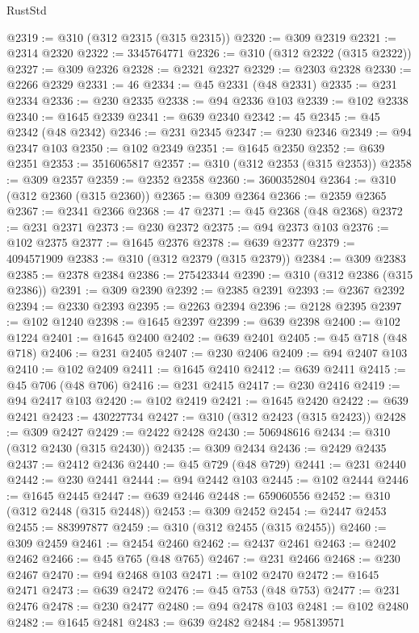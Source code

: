 \begin{lexlean}{RustStd}
\begin{coremodule}
{\begin{coremodule}
{{{{{{{{{{{{{{{{{{{{{{{{{{{{{{{{{{{{{@2319 := @310 (@312 @2315 (@315 @2315))
@2320 := @309 @2319
@2321 := @2314 @2320
@2322 := 3345764771
@2326 := @310 (@312 @2322 (@315 @2322))
@2327 := @309 @2326
@2328 := @2321 @2327
@2329 := @2303 @2328
@2330 := @2266 @2329
@2331 := 46
@2334 := @45 @2331 (@48 @2331)
@2335 := @231 @2334
@2336 := @230 @2335
@2338 := @94 @2336 @103
@2339 := @102 @2338
@2340 := @1645 @2339
@2341 := @639 @2340
@2342 := 45
@2345 := @45 @2342 (@48 @2342)
@2346 := @231 @2345
@2347 := @230 @2346
@2349 := @94 @2347 @103
@2350 := @102 @2349
@2351 := @1645 @2350
@2352 := @639 @2351
@2353 := 3516065817
@2357 := @310 (@312 @2353 (@315 @2353))
@2358 := @309 @2357
@2359 := @2352 @2358
@2360 := 3600352804
@2364 := @310 (@312 @2360 (@315 @2360))
@2365 := @309 @2364
@2366 := @2359 @2365
@2367 := @2341 @2366
@2368 := 47
@2371 := @45 @2368 (@48 @2368)
@2372 := @231 @2371
@2373 := @230 @2372
@2375 := @94 @2373 @103
@2376 := @102 @2375
@2377 := @1645 @2376
@2378 := @639 @2377
@2379 := 4094571909
@2383 := @310 (@312 @2379 (@315 @2379))
@2384 := @309 @2383
@2385 := @2378 @2384
@2386 := 275423344
@2390 := @310 (@312 @2386 (@315 @2386))
@2391 := @309 @2390
@2392 := @2385 @2391
@2393 := @2367 @2392
@2394 := @2330 @2393
@2395 := @2263 @2394
@2396 := @2128 @2395
@2397 := @102 @1240
@2398 := @1645 @2397
@2399 := @639 @2398
@2400 := @102 @1224
@2401 := @1645 @2400
@2402 := @639 @2401
@2405 := @45 @718 (@48 @718)
@2406 := @231 @2405
@2407 := @230 @2406
@2409 := @94 @2407 @103
@2410 := @102 @2409
@2411 := @1645 @2410
@2412 := @639 @2411
@2415 := @45 @706 (@48 @706)
@2416 := @231 @2415
@2417 := @230 @2416
@2419 := @94 @2417 @103
@2420 := @102 @2419
@2421 := @1645 @2420
@2422 := @639 @2421
@2423 := 430227734
@2427 := @310 (@312 @2423 (@315 @2423))
@2428 := @309 @2427
@2429 := @2422 @2428
@2430 := 506948616
@2434 := @310 (@312 @2430 (@315 @2430))
@2435 := @309 @2434
@2436 := @2429 @2435
@2437 := @2412 @2436
@2440 := @45 @729 (@48 @729)
@2441 := @231 @2440
@2442 := @230 @2441
@2444 := @94 @2442 @103
@2445 := @102 @2444
@2446 := @1645 @2445
@2447 := @639 @2446
@2448 := 659060556
@2452 := @310 (@312 @2448 (@315 @2448))
@2453 := @309 @2452
@2454 := @2447 @2453
@2455 := 883997877
@2459 := @310 (@312 @2455 (@315 @2455))
@2460 := @309 @2459
@2461 := @2454 @2460
@2462 := @2437 @2461
@2463 := @2402 @2462
@2466 := @45 @765 (@48 @765)
@2467 := @231 @2466
@2468 := @230 @2467
@2470 := @94 @2468 @103
@2471 := @102 @2470
@2472 := @1645 @2471
@2473 := @639 @2472
@2476 := @45 @753 (@48 @753)
@2477 := @231 @2476
@2478 := @230 @2477
@2480 := @94 @2478 @103
@2481 := @102 @2480
@2482 := @1645 @2481
@2483 := @639 @2482
@2484 := 958139571
}}}}}}}}}}}}}}}}}}}}}}}}}}}}}}}}}}}}}
\end{coremodule}}
\end{coremodule}
\end{lexlean}
